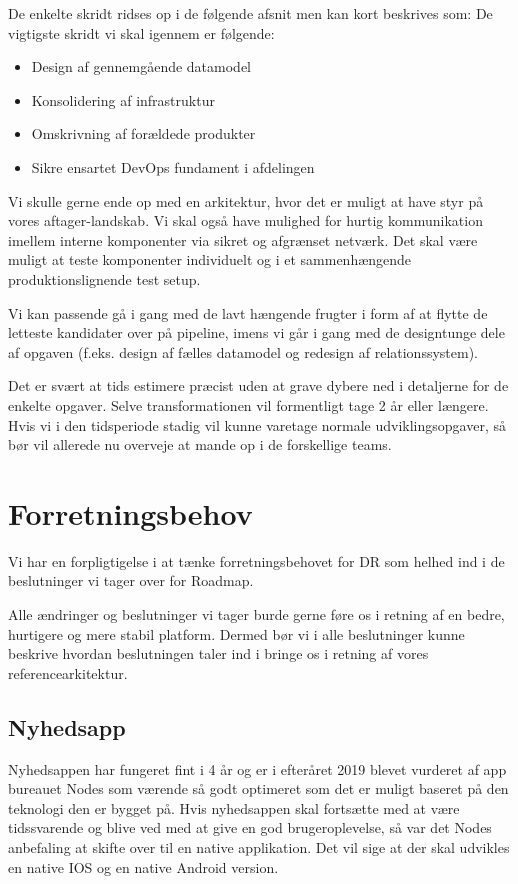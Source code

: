 \documentclass{article}
\begin{document}
De enkelte skridt ridses op i de følgende afsnit men kan kort beskrives som:
De vigtigste skridt vi skal igennem er følgende:
\begin{itemize}
\item Design af gennemgående datamodel
\item Konsolidering af infrastruktur
\item Omskrivning af forældede produkter
\item Sikre ensartet DevOps fundament i afdelingen
\end{itemize}
Vi skulle gerne ende op med en arkitektur, hvor det er muligt at have styr på vores aftager-landskab. Vi skal også have mulighed for hurtig kommunikation imellem interne komponenter via sikret og afgrænset netværk. Det skal være muligt at teste komponenter individuelt og i et sammenhængende produktionslignende test setup.

Vi kan passende gå i gang med de lavt hængende frugter i form af at flytte de letteste kandidater over på pipeline, imens vi går i gang med de designtunge dele af opgaven (f.eks. design af fælles datamodel og redesign af relationssystem).

Det er svært at tids estimere præcist uden at grave dybere ned i detaljerne for de enkelte opgaver. Selve transformationen vil formentligt tage 2 år eller længere. Hvis vi i den tidsperiode stadig vil kunne varetage normale udviklingsopgaver, så bør vil allerede nu overveje at mande op i de forskellige teams.


\section{Forretningsbehov}
Vi har en forpligtigelse i at tænke forretningsbehovet for DR som helhed ind i de beslutninger vi tager over for Roadmap.

Alle ændringer og beslutninger vi tager burde gerne føre os i retning af en bedre, hurtigere og mere stabil platform. Dermed bør vi i alle beslutninger kunne beskrive hvordan beslutningen taler ind i bringe os i retning af vores referencearkitektur.


\subsection{Nyhedsapp}
Nyhedsappen har fungeret fint i 4 år og er i efteråret 2019 blevet vurderet af app bureauet Nodes som værende så godt optimeret som det er muligt baseret på den teknologi den er bygget på. Hvis nyhedsappen skal fortsætte med at være tidssvarende og blive ved med at give en god brugeroplevelse, så var det Nodes anbefaling at skifte over til en native applikation. Det vil sige at der skal udvikles en native IOS og en native Android version.
\end{document}
